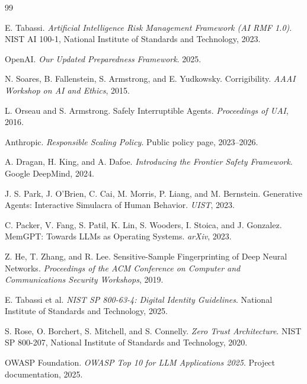 \documentclass[11pt]{article}
\begin{document}
\begingroup
\sloppy
\begin{thebibliography}{99}

E. Tabassi.
\textit{Artificial Intelligence Risk Management Framework (AI RMF 1.0)}.
NIST AI 100-1, National Institute of Standards and Technology, 2023.

OpenAI.
\textit{Our Updated Preparedness Framework}.
2025.

N. Soares, B. Fallenstein, S. Armstrong, and E. Yudkowsky.
Corrigibility.
\textit{AAAI Workshop on AI and Ethics}, 2015.

L. Orseau and S. Armstrong.
Safely Interruptible Agents.
\textit{Proceedings of UAI}, 2016.

Anthropic.
\textit{Responsible Scaling Policy}.
Public policy page, 2023--2026.

A. Dragan, H. King, and A. Dafoe.
\textit{Introducing the Frontier Safety Framework}.
Google DeepMind, 2024.

J. S. Park, J. O'Brien, C. Cai, M. Morris, P. Liang, and M. Bernstein.
Generative Agents: Interactive Simulacra of Human Behavior.
\textit{UIST}, 2023.

C. Packer, V. Fang, S. Patil, K. Lin, S. Wooders, I. Stoica, and J. Gonzalez.
MemGPT: Towards LLMs as Operating Systems.
\textit{arXiv}, 2023.

Z. He, T. Zhang, and R. Lee.
Sensitive-Sample Fingerprinting of Deep Neural
Networks.
\textit{Proceedings of the ACM Conference on Computer and Communications Security Workshops}, 2019.

E. Tabassi et al.
\textit{NIST SP 800-63-4: Digital Identity Guidelines}.
National Institute of Standards and Technology, 2025.

S. Rose, O. Borchert, S. Mitchell, and S. Connelly.
\textit{Zero Trust Architecture}.
NIST SP 800-207, National Institute of Standards and Technology, 2020.

OWASP Foundation.
\textit{OWASP Top 10 for LLM Applications 2025}.
Project documentation, 2025.

\end{thebibliography}
\endgroup
\end{document}

